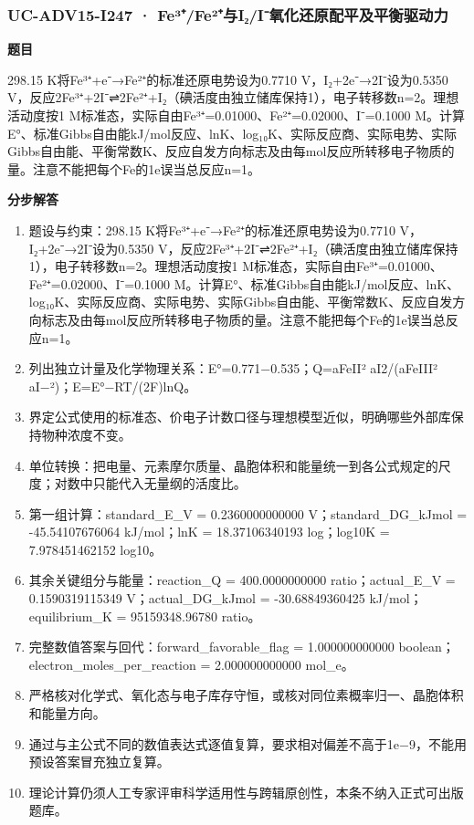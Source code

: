 \documentclass[UTF8,11pt,a4paper]{ctexart}
\begin{document}
\subsubsection*{UC-ADV15-I247 · Fe³⁺/Fe²⁺与I₂/I⁻氧化还原配平及平衡驱动力}
\noindent\textbf{题目}\par
298.15 K将Fe³⁺+e⁻→Fe²⁺的标准还原电势设为0.7710 V，I₂+2e⁻→2I⁻设为0.5350 V，反应2Fe³⁺+2I⁻⇌2Fe²⁺+I₂（碘活度由独立储库保持1），电子转移数n=2。理想活动度按1 M标准态，实际自由Fe³⁺=0.01000、Fe²⁺=0.02000、I⁻=0.1000 M。计算E°、标准Gibbs自由能kJ/mol反应、lnK、log₁₀K、实际反应商、实际电势、实际Gibbs自由能、平衡常数K、反应自发方向标志及由每mol反应所转移电子物质的量。注意不能把每个Fe的1e误当总反应n=1。\par
\medskip\noindent\textbf{分步解答}
\begin{enumerate}
\item 题设与约束：298.15 K将Fe³⁺+e⁻→Fe²⁺的标准还原电势设为0.7710 V，I₂+2e⁻→2I⁻设为0.5350 V，反应2Fe³⁺+2I⁻⇌2Fe²⁺+I₂（碘活度由独立储库保持1），电子转移数n=2。理想活动度按1 M标准态，实际自由Fe³⁺=0.01000、Fe²⁺=0.02000、I⁻=0.1000 M。计算E°、标准Gibbs自由能kJ/mol反应、lnK、log₁₀K、实际反应商、实际电势、实际Gibbs自由能、平衡常数K、反应自发方向标志及由每mol反应所转移电子物质的量。注意不能把每个Fe的1e误当总反应n=1。
\item 列出独立计量及化学物理关系：E°=0.771−0.535；Q=aFeII² aI2/(aFeIII² aI−²)；E=E°−RT/(2F)lnQ。
\item 界定公式使用的标准态、价电子计数口径与理想模型近似，明确哪些外部库保持物种浓度不变。
\item 单位转换：把电量、元素摩尔质量、晶胞体积和能量统一到各公式规定的尺度；对数中只能代入无量纲的活度比。
\item 第一组计算：standard\_E\_V = 0.2360000000000 V；standard\_DG\_kJmol = -45.54107676064 kJ/mol；lnK = 18.37106340193 log；log10K = 7.978451462152 log10。
\item 其余关键组分与能量：reaction\_Q = 400.0000000000 ratio；actual\_E\_V = 0.1590319115349 V；actual\_DG\_kJmol = -30.68849360425 kJ/mol；equilibrium\_K = 95159348.96780 ratio。
\item 完整数值答案与回代：forward\_favorable\_flag = 1.000000000000 boolean；electron\_moles\_per\_reaction = 2.000000000000 mol\_e。
\item 严格核对化学式、氧化态与电子库存守恒，或核对同位素概率归一、晶胞体积和能量方向。
\item 通过与主公式不同的数值表达式逐值复算，要求相对偏差不高于1e−9，不能用预设答案冒充独立复算。
\item 理论计算仍须人工专家评审科学适用性与跨辑原创性，本条不纳入正式可出版题库。
\end{enumerate}
\end{document}
